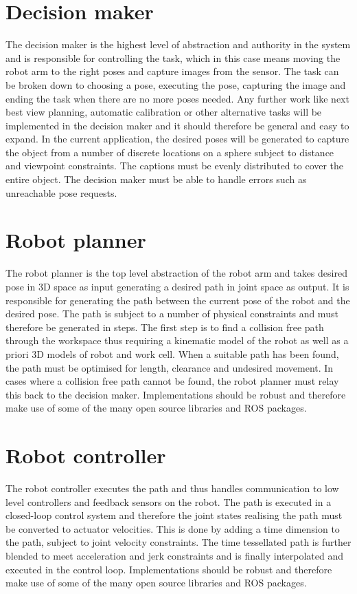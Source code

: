 \section{Decision maker}
The decision maker is the highest level of abstraction and authority in the system and is responsible for controlling the task, which in this case means moving the robot arm to the right poses and capture images from the sensor. The task can be broken down to choosing a pose, executing the pose, capturing the image and ending the task when there are no more poses needed. Any further work like next best view planning, automatic calibration or other alternative tasks will be implemented in the decision maker and it should therefore be general and easy to expand. In the current application, the desired poses will be generated to capture the object from a number of discrete locations on a sphere subject to distance and viewpoint constraints. The captions must be evenly distributed to cover the entire object. The decision maker must be able to handle errors such as unreachable pose requests.

\section{Robot planner}
The robot planner is the top level abstraction of the robot arm and takes desired pose in 3D space as input generating a desired path in joint space as output. It is responsible for generating the path between the current pose of the robot and the desired pose. The path is subject to a number of physical constraints and must therefore be generated in steps. The first step is to find a collision free path through the workspace thus requiring a kinematic model of the robot as well as a priori 3D models of robot and work cell. When a suitable path has been found, the path must be optimised for length, clearance and undesired movement. In cases where a collision free path cannot be found, the robot planner must relay this back to the decision maker. Implementations should be robust and therefore make use of some of the many open source libraries and ROS packages.  

\section{Robot controller}
The robot controller executes the path and thus handles communication to low level controllers and feedback sensors on the robot. The path is executed in a closed-loop control system and therefore the joint states realising the path must be converted to actuator velocities. This is done by adding a time dimension to the path, subject to joint velocity constraints. The time tessellated path is further blended to meet acceleration and jerk constraints and is finally interpolated and executed in the control loop. Implementations should be robust and therefore make use of some of the many open source libraries and ROS packages. 

